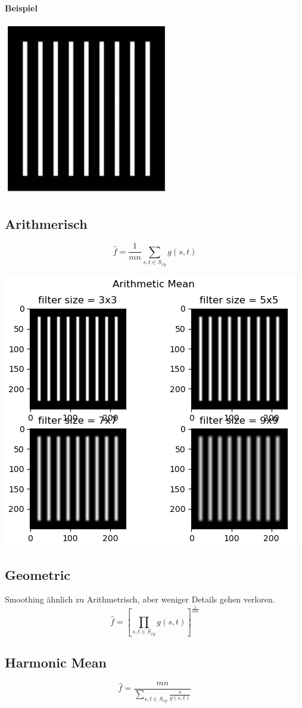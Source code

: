 \textbf{Beispiel}
\begin{center}
	\includegraphics[width=0.2\columnwidth]{Images/iriginal}
\end{center}


\subsection{Arithmerisch}
\[
\hat{f} = \frac{1}{mn}\sum_{s,t\in S_{xy}}g(s,t)
\]
\begin{center}
	\includegraphics[width=0.8\columnwidth]{Images/ar}
\end{center}


\subsection{Geometric}
Smoothing ähnlich zu Arithmetrisch, aber weniger Details gehen verloren.
\[
\hat{f} = \left[\prod_{s,t\in S_{xy}}g(s,t)\right]^{\frac{1}{mn}}
\]

\subsection{Harmonic Mean}
\[
\hat{f} = \frac{mn}{\sum_{s,t\in S_{xy}}\frac{s}{g(s,t)}}
\]

